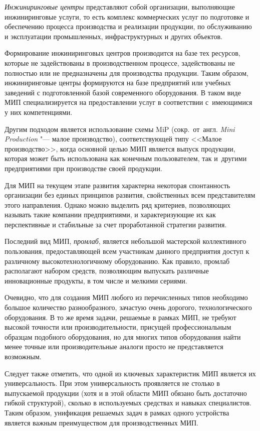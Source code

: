 \textit{Инжиниринговые центры} представляют собой организации, выполняющие инжиниринговые услуги, то есть комплекс коммерческих услуг по подготовке и обеспечению процесса производства и реализации продукции, по обслуживанию и эксплуатации промышленных, инфраструктурных и других объектов.

Формирование инжиниринговых центров производится на базе тех ресурсов, которые не задействованы в производственном процессе, задействованы не полностью или не предназначены для производства продукции. Таким образом, инжиниринговые центры формируются на базе предприятий или учебных заведений с подготовленной базой современного оборудования. В таком виде МИП специализируется на предоставлении услуг в соответствии с~имеющимися у них компетенциями.

Другим подходом является использование схемы MiP (сокр.~от~англ. \textit{Mini Production} "--- малое производство), соответствующей типу <<Малое производство>>, когда основной целью МИП является выпуск продукции, которая может быть использована как конечным пользователем, так и~другими предприятиями при производстве своей продукции.

Для МИП на текущем этапе развития характерна некоторая спонтанность организации без единых принципов развития, свойственных всем представителям этого направления. Однако можно выделить ряд критериев, позволяющих называть такие компании предприятиями, и характеризующие их как перспективные и стабильные за счет проработанной стратегии развития.

Последний вид МИП, \textit{промлаб}, является небольшой мастерской коллективного пользования, предоставляющей всем участникам данного предприятия доступ к различному высокотехнологичному оборудованию. Как правило, промлаб располагают набором средств, позволяющим выпускать различные инновационные продукты, в том числе и мелкими сериями. 

Очевидно, что для создания МИП любого из перечисленных типов необходимо большое количество разнообразного, зачастую очень дорогого, технологического оборудования. В то же время задачи, решаемые в рамках МИП, не требуют высокой точности или производительности, присущей профессиональным образцам подобного оборудования, но для многих типов оборудования найти менее точные или производительные аналоги просто не представляется возможным.

Следует также отметить, что одной из ключевых характеристик МИП является их универсальность. При этом универсальность проявляется не столько в выпускаемой продукции (хотя и в этой области МИП обязано быть достаточно гибкой структурой), сколько в используемых средствах и навыках специалистов. Таким образом, унификация решаемых задач в рамках одного устройства является важным преимуществом для производственных МИП.

